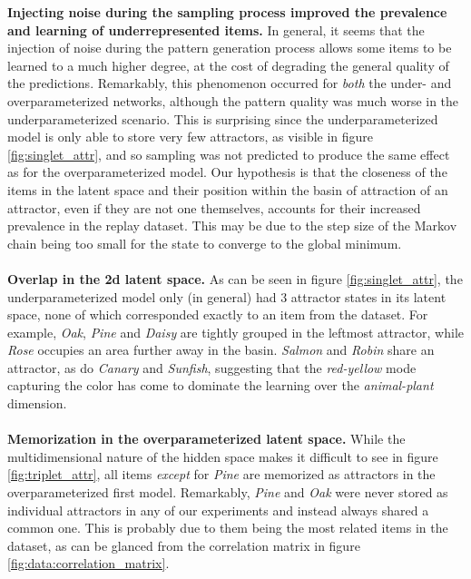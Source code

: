 \documentclass[11pt]{article}
\theoremstyle{remark}
\begin{document}
\textbf{Injecting noise during the sampling process improved the prevalence and learning of underrepresented items.} In general, it seems that the injection of noise during the pattern generation process allows some items to be learned to a much higher degree, at the cost of degrading the general quality of the predictions. Remarkably, this phenomenon occurred for \textit{both} the under- and overparameterized networks, although the pattern quality was much worse in the underparameterized scenario. This is surprising since the underparameterized model is only able to store very few attractors, as visible in figure \ref{fig:singlet_attr}, and so sampling was not predicted to produce the same effect as for the overparameterized model. Our hypothesis is that the closeness of the items in the latent space and their position within the basin of attraction of an attractor, even if they are not one themselves, accounts for their increased prevalence in the replay dataset. This may be due to the step size of the Markov chain being too small for the state to converge to the global minimum.
\\
\\
\textbf{Overlap in the 2d latent space.} As can be seen in figure \ref{fig:singlet_attr}, the underparameterized model only (in general) had 3 attractor states in its latent space, none of which corresponded exactly to an item from the dataset. For example, \textit{Oak}, \textit{Pine} and \textit{Daisy} are tightly grouped in the leftmost attractor, while \textit{Rose} occupies an area further away in the basin. \textit{Salmon} and \textit{Robin} share an attractor, as do \textit{Canary} and \textit{Sunfish}, suggesting that the \textit{red-yellow} mode capturing the color has come to dominate the learning over the \textit{animal-plant} dimension.
\\
\\
\textbf{Memorization in the overparameterized latent space.} While the multidimensional nature of the hidden space makes it difficult to see in figure \ref{fig:triplet_attr}, all items \textit{except} for \textit{Pine} are memorized as attractors in the overparameterized first model. Remarkably, \textit{Pine} and \textit{Oak} were never stored as individual attractors in any of our experiments and instead always shared a common one. This is probably due to them being the most related items in the dataset, as can be glanced from the correlation matrix in figure \ref{fig:data:correlation_matrix}.
\\
\\
\end{document}
